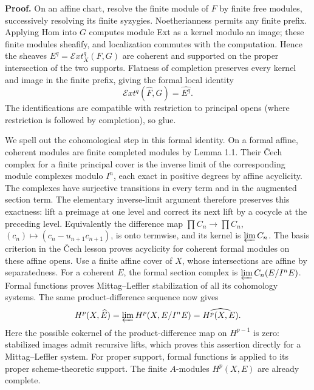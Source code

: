 \documentclass[11pt]{article}
\begin{document}
\textbf{Proof.} On an affine chart, resolve the finite module of \(F\)
by finite free modules, successively resolving its finite syzygies.
Noetherianness permits any finite prefix. Applying Hom into \(G\)
computes module Ext as a kernel modulo an image; these finite modules
sheafify, and localization commutes with the computation. Hence the
sheaves \(E^q=\mathcal Ext^q_X(F,G)\) are coherent and supported on the
proper intersection of the two supports. Flatness of completion
preserves every kernel and image in the finite prefix, giving the formal
local identity \[
\mathcal Ext^q(\widehat F,\widehat G)=\widehat{E^q}.
\] The identifications are compatible with restriction to principal
opens (where restriction is followed by completion), so glue.

We spell out the cohomological step in this formal identity. On a formal
affine, coherent modules are finite completed modules by Lemma 1.1.
Their Čech complex for a finite principal cover is the inverse limit of
the corresponding module complexes modulo \(I^n\), each exact in
positive degrees by affine acyclicity. The complexes have surjective
transitions in every term and in the augmented section term. The
elementary inverse-limit argument therefore preserves this exactness:
lift a preimage at one level and correct its next lift by a cocycle at
the preceding level. Equivalently the difference map
\(\prod C_n\to\prod C_n\), \((c_n)\mapsto(c_n-u_{n+1}c_{n+1})\), is onto
termwise, and its kernel is \(\varprojlim C_n\). The basis criterion in
the Čech lesson proves acyclicity for coherent formal modules on these
affine opens. Use a finite affine cover of \(X\), whose intersections
are affine by separatedness. For a coherent \(E\), the formal section
complex is \(\varprojlim C_n(E/I^nE)\). Formal functions proves
Mittag--Leffler stabilization of all its cohomology systems. The same
product-difference sequence now gives \[
H^p(X,\widehat E)=\varprojlim H^p(X,E/I^nE)
=\widehat{H^p(X,E)}.
\] Here the possible cokernel of the product-difference map on
\(H^{p-1}\) is zero: stabilized images admit recursive lifts, which
proves this assertion directly for a Mittag--Leffler system. For proper
support, formal functions is applied to its proper scheme-theoretic
support. The finite \(A\)-modules \(H^p(X,E)\) are already complete.
\end{document}

